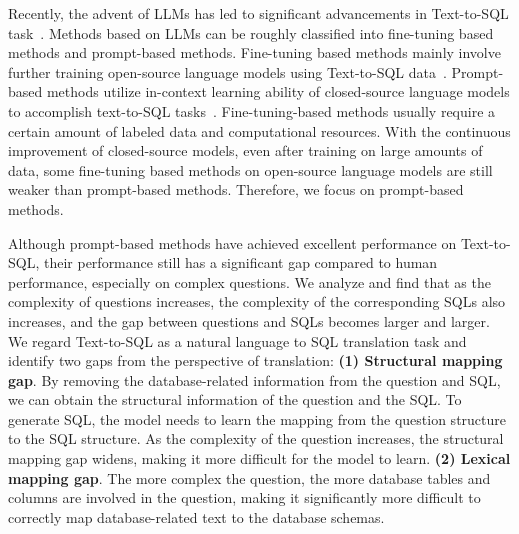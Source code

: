 Recently, the advent of LLMs has led to significant advancements in Text-to-SQL task~\citep{rajkumar2022evaluating,ni2023lever,gao2024text}. 
Methods based on LLMs can be roughly classified into fine-tuning based methods and prompt-based methods.
Fine-tuning based methods mainly involve further training open-source language models using Text-to-SQL data~\citep{li2024codes,pourreza2024dts}. 
Prompt-based methods utilize in-context learning ability of closed-source language models to accomplish text-to-SQL tasks~\citep{pourreza2024din,gao2024text,li2024dawn,qu2024before}.
Fine-tuning-based methods usually require a certain amount of labeled data and computational resources.
With the continuous improvement of closed-source models, even after training on large amounts of data, some fine-tuning based methods on open-source language models are still weaker than prompt-based methods. Therefore, we focus on prompt-based methods.

Although prompt-based methods have achieved excellent performance on Text-to-SQL, their performance still has a significant gap compared to human performance, especially on complex questions.
We analyze and find that as the complexity of questions increases, the complexity of the corresponding SQLs also increases, and the gap between questions and SQLs becomes larger and larger.
We regard Text-to-SQL as a natural language to SQL translation task and identify two gaps from the perspective of translation: \textbf{(1) Structural mapping gap}. 
By removing the database-related information from the question and SQL, we can obtain the structural information of the question and the SQL. 
To generate SQL, the model needs to learn the mapping from the question structure to the SQL structure. As the complexity of the question increases, the structural mapping gap widens, making it more difficult for the model to learn.
\textbf{(2) Lexical mapping gap}. The more complex the question, the more database tables and columns are involved in the question, making it significantly more difficult to correctly map database-related text to the database schemas.



